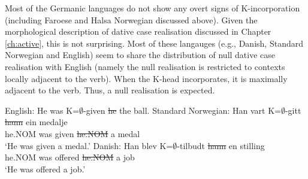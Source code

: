 Most of the Germanic languages do not show any overt signs of K-incorporation (including Faroese and Halsa Norwegian discussed above). Given the morphological description of dative case realisation discussed in Chapter \ref{ch:active}, this is not surprising. Most of these langauges (e.g., Danish, Standard Norwegian and English) seem to share the distribution of null dative case realisation with English (namely the null realisation is restricted to contexts locally adjacent to the verb). When the K-head incorporates, it is maximally adjacent to the verb. Thus, a null realisation is expected.

\begin{exe}
	\ex English: He was K=$\emptyset$-given \sout{he} the ball.
	\ex Standard Norwegian:
	\gll Han vart K=$\emptyset$-gitt \sout{hann} ein medalje\\
	he.NOM was given \sout{he.NOM} a medal\\
	\trans `He was given a medal.'
	\ex Danish:
	\gll Han blev K=$\emptyset$-tilbudt \sout{hann} en stilling\\
	he.NOM was offered \sout{he.NOM} a job\\
	\trans `He was offered a job.'
\end{exe}

